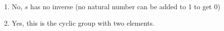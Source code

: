 \begin{enumerate}
    \item  No, $s$ has no inverse (no natural number can be added to 1 to get 0)
    \item Yes, this is the cyclic group with two elements.
  \end{enumerate}
